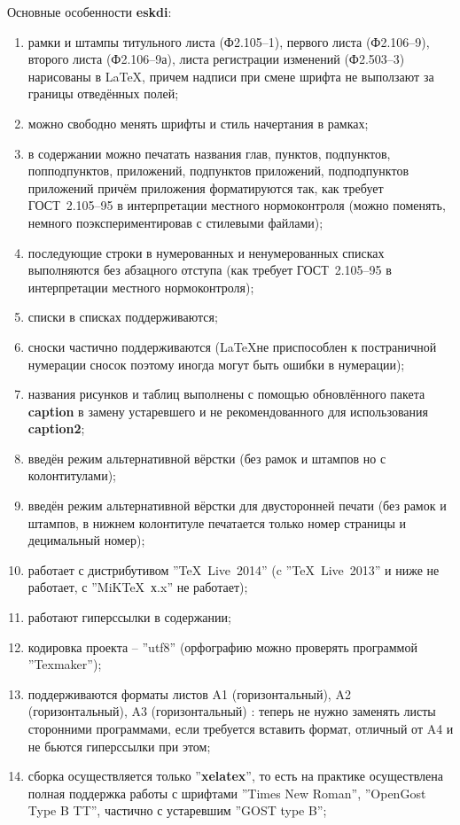 Основные особенности \textbf{eskdi}:
\begin{enumerate}
  \item рамки и штампы титульного листа (Ф2.105–1), первого листа (Ф2.106–9), второго листа (Ф2.106–9а), листа регистрации изменений (Ф2.503–3) нарисованы в \LaTeX, причем надписи при смене шрифта не выползают за границы отведённых полей;
  \item можно свободно менять шрифты и стиль начертания в рамках;
  \item в содержании можно печатать названия глав, пунктов, подпунктов, попподпунктов, приложений, подпунктов приложений, подподпунктов приложений причём приложения форматируются так, как требует ГОСТ~2.105–95 в интерпретации местного нормоконтроля (можно поменять, немного поэкспериментировав с стилевыми файлами);
  \item последующие строки в нумерованных и ненумерованных списках выполняются без абзацного отступа (как требует ГОСТ~2.105–95 в интерпретации местного нормоконтроля);
  \item списки в списках поддерживаются;
  \item сноски частично поддерживаются (\LaTeX не приспособлен к постраничной нумерации сносок поэтому иногда могут быть ошибки в нумерации);
  \item названия рисунков и таблиц выполнены с помощью обновлённого пакета \textbf{caption} в замену устаревшего и не рекомендованного для использования \textbf{caption2};
  \item введён режим альтернативной вёрстки (без рамок и штампов но с колонтитулами);
  \item введён режим альтернативной вёрстки для двусторонней печати (без рамок и штампов, в нижнем колонтитуле печатается только номер страницы и децимальный номер);  
  \item работает с дистрибутивом ''\TeX~Live~2014'' (c ''\TeX~Live~2013'' и ниже не работает, с  ''MiKTeX~х.x'' не работает);
  \item работают гиперссылки в содержании;  
  \item кодировка проекта – ''utf8'' (орфографию можно проверять программой ''Texmaker'');
  \item поддерживаются форматы листов A1 (горизонтальный), A2 (горизонтальный), A3 (горизонтальный) : теперь не нужно заменять листы сторонними программами, если требуется вставить формат, отличный от A4 и не бьются гиперссылки при этом;
  \item сборка осуществляется только ''\textbf{xelatex}'', то есть на практике осуществлена полная поддержка работы с шрифтами ''Times New Roman'', ''OpenGost Type B TT'', частично с устаревшим ''GOST type B'';

\end{enumerate}
